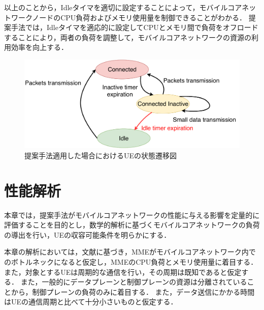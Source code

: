 \documentclass[technicalreport]{ieicej-rev}
\begin{document}
以上のことから，Idleタイマを適切に設定することによって，モバイルコアネットワークノードのCPU負荷およびメモリ使用量を制御できることがわかる．
提案手法では，Idleタイマを適応的に設定してCPUとメモリ間で負荷をオフロードすることにより，両者の負荷を調整して，モバイルコアネットワークの資源の利用効率を向上する．

\begin{figure}[!t]
  \centering
  \includegraphics[width=1.0\hsize]{state_change_propose.pdf}
  \caption{提案手法適用した場合におけるUEの状態遷移図}
  \label{state_change_propose}
\end{figure}



\section{性能解析}
\label{sec:解析}
本章では，提案手法がモバイルコアネットワークの性能に与える影響を定量的に評価することを目的とし，数学的解析に基づくモバイルコアネットワークの負荷の導出を行い，UEの収容可能条件を明らかにする．

本章の解析においては，文献\cite{ACloudNativeSolutionforDynamicAutoScalingofMMEinLTE}に基づき，MMEがモバイルコアネットワーク内でのボトルネックになると仮定し，MMEのCPU負荷とメモリ使用量に着目する．
また，対象とするUEは周期的な通信を行い，その周期は既知であると仮定する．
また，一般的にデータプレーンと制御プレーンの資源は分離されていることから，制御プレーンの負荷のみに着目する．
また，データ送信にかかる時間はUEの通信周期と比べて十分小さいものと仮定する．
\end{document}
